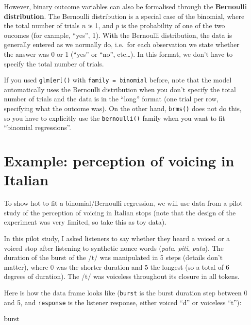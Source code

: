 \documentclass[
]{article}
\newenvironment{Shaded}{\begin{snugshade}}{\end{snugshade}}
\newcommand{\NormalTok}[1]{#1}
\begin{document}
However, binary outcome variables can also be formalised through the
\textbf{Bernoulli distribution}. The Bernoulli distribution is a special
case of the binomial, where the total number of trials \(n\) is 1, and
\(p\) is the probability of one of the two oucomes (for example,
``yes'', 1). With the Bernoulli distribution, the data is generally
entered as we normally do, i.e.~for each observation we state whether
the answer was 0 or 1 (``yes'' or ``no'', etc\ldots). In this format, we
don't have to specify the total number of trials.

If you used \texttt{glm{[}er{]}()} with \texttt{family\ =\ binomial}
before, note that the model automatically uses the Bernoulli
distribution when you don't specify the total number of trials and the
data is in the ``long'' format (one trial per row, specifying what the
outcome was). On the other hand, \texttt{brms()} does not do this, so
you have to explicitly use the \texttt{bernoulli()} family when you want
to fit ``binomial regressions''.

\hypertarget{example-perception-of-voicing-in-italian}{%
\section{Example: perception of voicing in
Italian}\label{example-perception-of-voicing-in-italian}}

To show hot to fit a binomial/Bernoulli regression, we will use data
from a pilot study of the perception of voicing in Italian stops (note
that the design of the experiment was very limited, so take this as toy
data).

In this pilot study, I asked listeners to say whether they heard a
voiced or a voiced stop after listening to synthetic nonce words
(\emph{pata}, \emph{piti}, \emph{putu}). The duration of the burst of
the /t/ was manipulated in 5 steps (details don't matter), where 0 was
the shorter duration and 5 the longest (so a total of 6 degrees of
duration). The /t/ was voiceless throughout its closure in all tokens.

Here is how the data frame looks like (\texttt{burst} is the burst
duration step between 0 and 5, and \texttt{response} is the listener
response, either voiced ``d'' or voiceless ``t''):

\begin{Shaded}
\begin{Highlighting}[]
\NormalTok{burst}
\end{Highlighting}
\end{Shaded}
\end{document}
